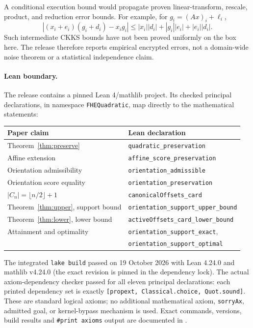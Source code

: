 \documentclass[10pt]{article}
\begin{document}
A conditional execution bound would propagate proven linear-transform, rescale, product, and reduction error bounds. For example, for $g_i=(Ax)_i+\ell_i$,
\[
|(x_i+e_i)(g_i+d_i)-x_ig_i|
\le |x_i||d_i|+|g_i||e_i|+|e_i||d_i|.
\]
Such intermediate CKKS bounds have not been proved uniformly on the box here. The release therefore reports empirical encrypted errors, not a domain-wide noise theorem or a statistical independence claim.

\paragraph{Lean boundary.}
The release contains a pinned Lean 4/mathlib project. Its checked principal declarations, in namespace \texttt{FHEQuadratic}, map directly to the mathematical statements:
\begin{center}\small
\begin{tabular}{ll}\toprule
Paper claim & Lean declaration\\\midrule
Theorem~\ref{thm:preserve} & \texttt{quadratic\_preservation}\\
Affine extension & \texttt{affine\_score\_preservation}\\
Orientation admissibility & \texttt{orientation\_admissible}\\
Orientation score equality & \texttt{orientation\_preservation}\\
$|C_n|=\lfloor n/2\rfloor+1$ & \texttt{canonicalOffsets\_card}\\
Theorem~\ref{thm:upper}, support bound & \texttt{orientation\_support\_upper\_bound}\\
Theorem~\ref{thm:lower}, lower bound & \texttt{activeOffsets\_card\_lower\_bound}\\
Attainment and optimality & \texttt{orientation\_support\_exact},\\
& \texttt{orientation\_support\_optimal}\\\bottomrule
\end{tabular}
\end{center}
The integrated \texttt{lake build} passed on 19 October 2026 with Lean 4.24.0 and mathlib v4.24.0 (the exact revision is pinned in the dependency lock). The actual axiom-dependency checker passed for all eleven principal declarations: each printed dependency set is exactly \texttt{[propext, Classical.choice, Quot.sound]}. These are standard logical axioms; no additional mathematical axiom, \texttt{sorryAx}, admitted goal, or kernel-bypass mechanism is used. Exact commands, versions, build results and \texttt{\#print axioms} output are documented in .
\end{document}
